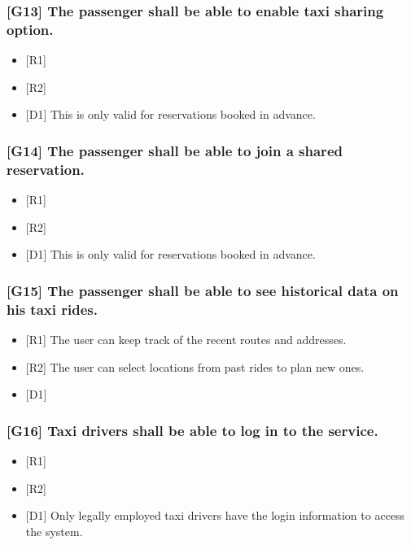 \documentclass[a4paper,11pt]{report} %
\begin{document}
	\subsubsection{{[}G13{]} The passenger shall be able to enable taxi sharing option.}
	\begin{itemize}
		\item {[}R1{]} 
		\item {[}R2{]}
		\item {[}D1{]} This is only valid for reservations booked in advance.
	\end{itemize}
	
	\subsubsection{{[}G14{]} The passenger shall be able to join a shared reservation.}
	\begin{itemize}
		\item {[}R1{]} 
		\item {[}R2{]}
		\item {[}D1{]} This is only valid for reservations booked in advance.
	\end{itemize}
	
	\subsubsection{{[}G15{]} The passenger shall be able to see historical data on his taxi rides.}
	\begin{itemize}
		\item {[}R1{]} The user can keep track of the recent routes and addresses.
		\item {[}R2{]} The user can select locations from past rides to plan new ones.
		\item {[}D1{]}
	\end{itemize}

	\subsubsection{{[}G16{]} Taxi drivers shall be able to log in to the service.}
	\begin{itemize}
		\item {[}R1{]}
		\item {[}R2{]}
		\item {[}D1{]} Only legally employed taxi drivers have the login information to access the system.
	\end{itemize}
	
\end{document}
